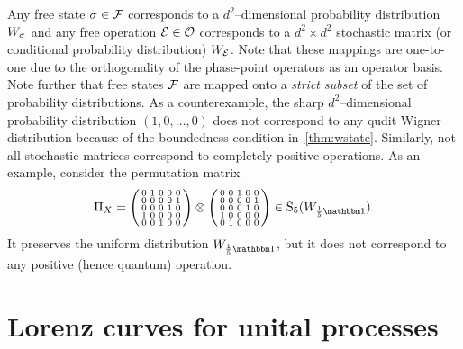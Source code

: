 \documentclass[pra,
aps,
twocolumn,
superscriptaddress,
groupedaddress,
nofootinbib,
reprint
]{revtex4-1}
\begin{document}
Any free state $\sigma \in {\mathcal F}$ corresponds to a $d^2$--dimensional probability distribution $\W{\sigma}$ and any free operation ${\mathcal E} \in {\mathcal O}$ corresponds to a $d^2 \times d^2$ stochastic matrix (or conditional probability distribution) $\W{\E}$.
Note that these mappings are one-to-one due to the orthogonality of the phase-point operators as an operator basis.
Note further that free states ${\mathcal F}$ are mapped onto a \emph{strict subset} of the set of probability distributions.
As a counterexample, the sharp $d^2$--dimensional probability distribution $(1, 0, \dots, 0)$ does not correspond to any qudit Wigner distribution because of the boundedness condition in~\cref{thm:wstate}.
Similarly, not all stochastic matrices correspond to completely positive operations.
As an example, consider the permutation matrix
\begin{equation}
    \Pi_X = \begin{psmallmatrix}
        0 & 1 & 0 & 0 & 0 \\
        0 & 0 & 0 & 0 & 1 \\
        0 & 0 & 0 & 1 & 0 \\
        1 & 0 & 0 & 0 & 0 \\
        0 & 0 & 1 & 0 & 0
    \end{psmallmatrix} \otimes \begin{psmallmatrix}
        0 & 0 & 1 & 0 & 0 \\
        0 & 0 & 0 & 0 & 1 \\
        0 & 0 & 0 & 1 & 0 \\
        1 & 0 & 0 & 0 & 0 \\
        0 & 1 & 0 & 0 & 0    
    \end{psmallmatrix} \in {\rm{S}}_5({\W{\frac{1}{5}\id}}).
\end{equation}
It preserves the uniform distribution $\W{\frac{1}{5}\id}$, but it does not correspond to any positive (hence quantum) operation.


\section{Lorenz curves for unital processes}
\label{app:lcsu_technical}
\end{document}
